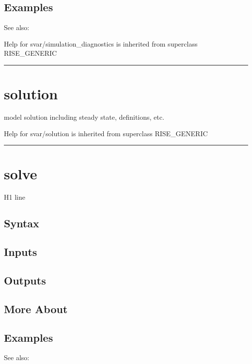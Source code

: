 \documentclass[letterpaper,10pt,english]{sphinxmanual}
\begin{document}
\subsection{Examples}
\label{classes/models/@svar/svar:id143}
See also:

Help for svar/simulation\_diagnostics is inherited from superclass RISE\_GENERIC


\bigskip\hrule{}\bigskip



\section{solution}
\label{classes/models/@svar/svar:id144}\label{classes/models/@svar/svar:solution}
model solution including steady state, definitions, etc.

Help for svar/solution is inherited from superclass RISE\_GENERIC


\bigskip\hrule{}\bigskip



\section{solve}
\label{classes/models/@svar/svar:id145}\label{classes/models/@svar/svar:solve}
H1 line


\subsection{Syntax}
\label{classes/models/@svar/svar:id146}

\subsection{Inputs}
\label{classes/models/@svar/svar:id147}

\subsection{Outputs}
\label{classes/models/@svar/svar:id148}

\subsection{More About}
\label{classes/models/@svar/svar:id149}

\subsection{Examples}
\label{classes/models/@svar/svar:id150}
See also:
\end{document}
